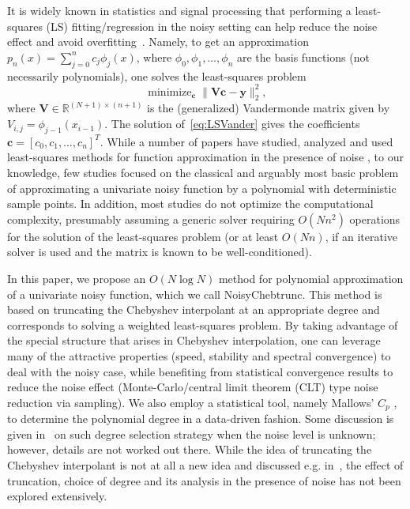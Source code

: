 \documentclass[final,onefignum,onetabnum]{siamart220329}
\def\mainalg{NoisyChebtrunc}
\DeclareMathOperator*{\minimize}{minimize}
\newcommand{\vct}[1]{\bm{#1}}
\newcommand{\mtx}[1]{\bm{#1}}
\begin{document}
It is widely known in statistics and signal processing that performing a least-squares (LS) fitting/regression
in the noisy setting can help reduce the noise effect and avoid overfitting~\cite{dahlquist2008numerical,wasserman2013all}. Namely, to get an approximation $p_n(x)=\sum_{j=0}^n c_j \phi_j(x)$, where $\phi_0,\phi_1,\dots,\phi_n$ are the basis functions (not necessarily polynomials), one solves the least-squares problem 
\begin{equation}
	\label{eq:LSVander}
	\minimize_{\vct{c}} \|\mtx{V}\vct{c}-\vct{y}\|_2^2, 
\end{equation}
where $\mtx{V}\in\mathbb{R}^{(N+1)\times (n+1)}$ is the (generalized) Vandermonde matrix given by $V_{i,j}=\phi_{j-1}(x_{i-1})$. 
The solution of~\eqref{eq:LSVander} gives the coefficients $\vct{c}=[c_0,c_1,\ldots,c_n]^T$. 
While a number of papers have studied, analyzed and used least-squares methods for function approximation in the presence of noise \cite{belloni2015some,tsybakov,wasserman2006all},
to our knowledge, few studies focused on the classical and arguably most basic problem of approximating a univariate noisy function by a polynomial with deterministic sample points.
In addition, most studies do not optimize the computational complexity, presumably assuming a generic solver requiring $O(Nn^2)$ operations for the solution of the least-squares problem (or at least $O(Nn)$, if an iterative solver is used and the matrix is known to be well-conditioned).

In this paper, we propose {an $O(N\log N)$} method for polynomial approximation of a univariate noisy function, which we call \mainalg.
This method is based on truncating the Chebyshev interpolant at an appropriate degree and corresponds to solving a weighted least-squares problem. By taking advantage of the special structure that arises in Chebyshev interpolation, one can leverage many of the attractive properties (speed, stability and spectral convergence) to deal with the noisy case, while benefiting from statistical convergence results to reduce the noise effect (Monte-Carlo/central limit theorem (CLT) type noise reduction via sampling). 
We also employ a statistical tool, namely Mallows' $C_p$ \cite{mallows2000some}, to determine the polynomial degree in a data-driven fashion. Some discussion is given in~\cite{cohen2013stability} on such degree selection strategy when the noise level is unknown; however, details are not worked out there. 
While the idea of truncating  the Chebyshev interpolant is not at all a new idea and discussed e.g. in~\cite{aurentz2017chopping}, the effect of truncation, choice of degree and its analysis in the presence of noise has not been explored extensively. 
\end{document}
